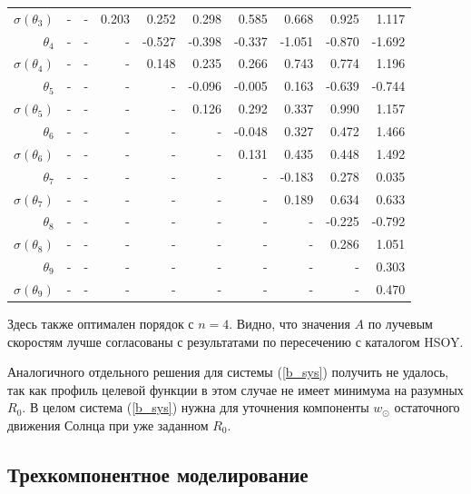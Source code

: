 \documentclass{matmex-diploma-custom}
\begin{document}
\begin{table}[h!!]
\begin{tabular}{r|rrr|r|rrrrr}
 $\sigma(\theta_3)$&-      &    - &   0.203 &   0.252 &   0.298 &   0.585 &   0.668 &   0.925 &   1.117  \\
 $\theta_4$&-      &    - &    - &  -0.527 &  -0.398 &  -0.337 &  -1.051 &  -0.870 &  -1.692  \\
 $\sigma(\theta_4)$&-      &    - &    - &    0.148 &   0.235 &   0.266 &   0.743 &   0.774 &   1.196  \\
 $\theta_5$&-      &    - &    - &    - &  -0.096 &  -0.005 &   0.163 &  -0.639 &  -0.744  \\
 $\sigma(\theta_5)$&-      &    - &    - &    - &    0.126 &   0.292 &   0.337 &   0.990 &   1.157  \\
 $\theta_6$&-      &    - &    - &    - &    - &   -0.048 &   0.327 &   0.472 &   1.466  \\
 $\sigma(\theta_6)$&-    &    - &    - &    - &    - &   0.131 &   0.435 &   0.448 &   1.492  \\
 $\theta_7$&-     &    - &    - &    - &    - &    - &  -0.183 &   0.278 &   0.035  \\
 $ \sigma(\theta_7)$&-     &    - &    - &    - &    - &    - &     0.189 &   0.634 &   0.633  \\
 $\theta_8$&-     &    - &    - &    - &    - &    - &    - &   -0.225 &  -0.792  \\
 $ \sigma(\theta_8)$&-     &    - &    - &    - &    - &    - &    - &    0.286 &   1.051  \\
 $\theta_9$&-     &    - &    - &    - &    - &    - &    - &    - &  0.303  \\
 $ \sigma(\theta_9)$&-     &    - &    - &    - &    - &    - &    - &    - &   0.470  \\
\end{tabular}
\end{table}

\par Здесь также оптимален порядок с $n=4$. Видно, что значения $A$ по лучевым скоростям лучше согласованы с результатами по пересечению с каталогом HSOY.

Аналогичного отдельного решения для системы (\ref{b_sys}) получить не удалось, так как профиль целевой функции в этом случае не имеет минимума на разумных $R_0$. В целом система (\ref{b_sys}) нужна для уточнения компоненты $w_{\odot}$ остаточного движения Солнца при уже заданном $R_0$.

\pagebreak
\subsection{Трехкомпонентное моделирование}
\end{document}
